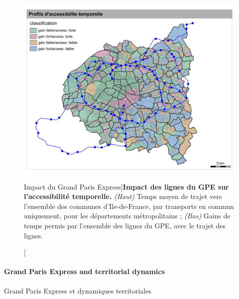 \begin{figure}
	\includegraphics[width=\linewidth]{Figures/Final/1-2-1-fig-casestudies-gpe.jpg}
	\caption[Impact of \emph{Grand Paris Express}][Impact du Grand Paris Express]{\label{fig:casestudies:gpe}}{\textbf{Impact des lignes du GPE sur l'accessibilité temporelle.} \textit{(Haut)} Temps moyen de trajet vers l'ensemble des communes d'Ile-de-France, par transports en commun uniquement, pour les départements métropolitains ; \textit{(Bas)} Gains de temps permis par l'ensemble des lignes du GPE, avec le trajet des lignes.\label{fig:casestudies:gpe}}
\end{figure}



\paragraph{Grand Paris Express and territorial dynamics}{Grand Paris Express et dynamiques territoriales}


